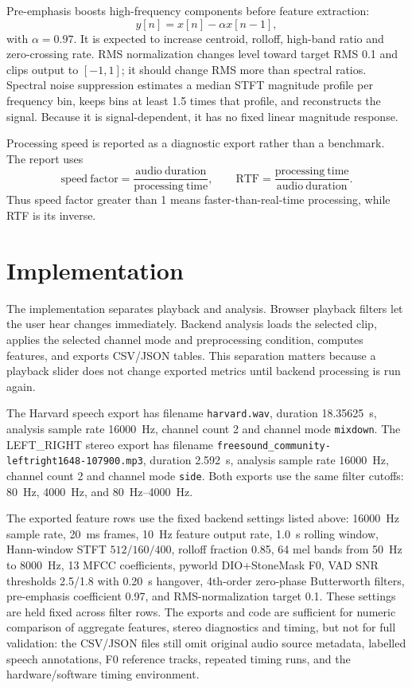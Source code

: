 \documentclass[11pt,a4paper]{article}
\begin{document}
Pre-emphasis boosts high-frequency components before feature extraction:
\begin{equation}
    y[n]=x[n]-\alpha x[n-1],
\end{equation}
with $\alpha=0.97$. It is expected to increase centroid, rolloff, high-band ratio and zero-crossing rate. RMS normalization changes level toward target RMS 0.1 and clips output to $[-1,1]$; it should change RMS more than spectral ratios. Spectral noise suppression estimates a median STFT magnitude profile per frequency bin, keeps bins at least 1.5 times that profile, and reconstructs the signal. Because it is signal-dependent, it has no fixed linear magnitude response.

Processing speed is reported as a diagnostic export rather than a benchmark. The report uses
\begin{equation}
    \mathrm{speed\ factor}=\frac{\mathrm{audio\ duration}}{\mathrm{processing\ time}},
    \qquad
    \mathrm{RTF}=\frac{\mathrm{processing\ time}}{\mathrm{audio\ duration}}.
\end{equation}
Thus speed factor greater than 1 means faster-than-real-time processing, while RTF is its inverse.

\section{Implementation}

The implementation separates playback and analysis. Browser playback filters let the user hear changes immediately. Backend analysis loads the selected clip, applies the selected channel mode and preprocessing condition, computes features, and exports CSV/JSON tables. This separation matters because a playback slider does not change exported metrics until backend processing is run again.

The Harvard speech export has filename \texttt{harvard.wav}, duration \SI{18.35625}{s}, analysis sample rate \SI{16000}{Hz}, channel count 2 and channel mode \texttt{mixdown}. The LEFT\_RIGHT stereo export has filename \texttt{freesound\_community-leftright1648-107900.mp3}, duration \SI{2.592}{s}, analysis sample rate \SI{16000}{Hz}, channel count 2 and channel mode \texttt{side}. Both exports use the same filter cutoffs: \SI{80}{Hz}, \SI{4000}{Hz}, and \SIrange{80}{4000}{Hz}.

The exported feature rows use the fixed backend settings listed above: \SI{16000}{Hz} sample rate, \SI{20}{ms} frames, \SI{10}{Hz} feature output rate, \SI{1.0}{s} rolling window, Hann-window STFT $512/160/400$, rolloff fraction 0.85, 64 mel bands from \SI{50}{Hz} to \SI{8000}{Hz}, 13 MFCC coefficients, pyworld DIO+StoneMask F0, VAD SNR thresholds 2.5/1.8 with \SI{0.20}{s} hangover, 4th-order zero-phase Butterworth filters, pre-emphasis coefficient 0.97, and RMS-normalization target 0.1. These settings are held fixed across filter rows. The exports and code are sufficient for numeric comparison of aggregate features, stereo diagnostics and timing, but not for full validation: the CSV/JSON files still omit original audio source metadata, labelled speech annotations, F0 reference tracks, repeated timing runs, and the hardware/software timing environment.
\end{document}
